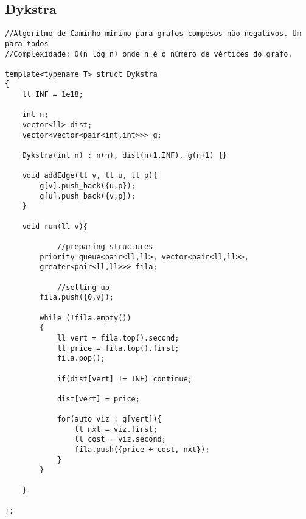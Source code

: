 \documentclass[11pt, a4paper, twoside]{article}
\begin{document}
\subsection{Dykstra}
\begin{verbatim}
//Algoritmo de Caminho mínimo para grafos compesos não negativos. Um para todos
//Complexidade: O(n log n) onde n é o número de vértices do grafo.

template<typename T> struct Dykstra
{
    ll INF = 1e18;
    
    int n;
    vector<ll> dist;
    vector<vector<pair<int,int>>> g;
    
    Dykstra(int n) : n(n), dist(n+1,INF), g(n+1) {}
    
    void addEdge(ll v, ll u, ll p){
        g[v].push_back({u,p});
        g[u].push_back({v,p});
    }
    
    void run(ll v){
    
            //preparing structures
        priority_queue<pair<ll,ll>, vector<pair<ll,ll>>, 
        greater<pair<ll,ll>>> fila;
    
            //setting up
        fila.push({0,v});
            
        while (!fila.empty())
        {      
            ll vert = fila.top().second;
            ll price = fila.top().first;
            fila.pop();
    
            if(dist[vert] != INF) continue;
    
            dist[vert] = price;
    
            for(auto viz : g[vert]){
                ll nxt = viz.first;
                ll cost = viz.second;
                fila.push({price + cost, nxt});
            }
        }
    
    }
    
};

\end{verbatim}
\end{document}
